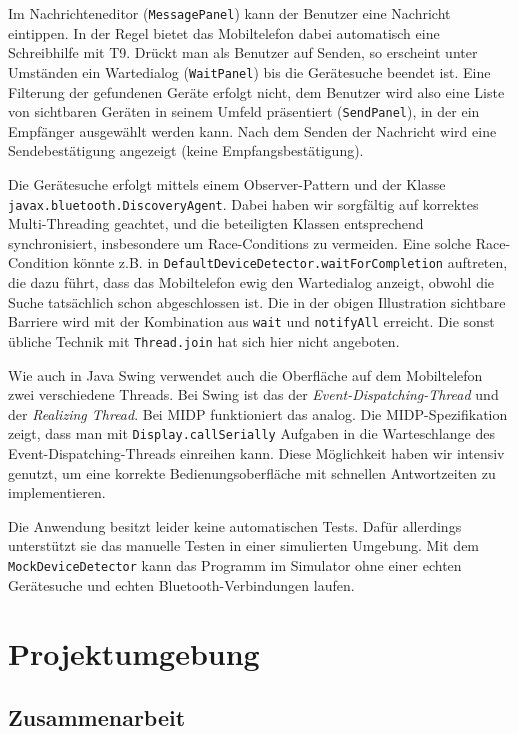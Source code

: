 \documentclass[ngerman]{article}
\begin{document}
Im Nachrichteneditor ({\tt MessagePanel}) kann der Benutzer eine Nachricht eintippen.
In der Regel bietet das Mobiltelefon dabei automatisch eine Schreibhilfe mit T9. Drückt
man als Benutzer auf Senden, so erscheint unter Umständen ein Wartedialog ({\tt WaitPanel}) 
bis die  Gerätesuche beendet ist. Eine Filterung der gefundenen Geräte erfolgt nicht, dem Benutzer
wird also eine Liste von sichtbaren Geräten in seinem Umfeld präsentiert ({\tt SendPanel}),
in der ein Empfänger ausgewählt werden kann. Nach dem Senden der Nachricht wird eine
Sen\-de\-be\-stä\-ti\-gung angezeigt (keine Empfangsbestätigung).

Die Gerätesuche erfolgt mittels einem Observer-Pattern und der Klasse \\{\tt javax.bluetooth.DiscoveryAgent}.
Dabei haben wir sorgfältig auf korrektes Multi-Threading geachtet, und die beteiligten Klassen entsprechend 
synchronisiert, insbesondere um Race-Conditions zu vermeiden. Eine solche Race-Condi\-tion könnte z.B. in
{\tt DefaultDeviceDetector.waitForCompletion} auftreten, die dazu führt, dass das Mobiltelefon ewig den
Wartedialog anzeigt, obwohl die Suche tatsächlich schon abgeschlossen ist. Die in der obigen Illustration
sichtbare Barriere wird mit der Kombination aus {\tt wait} und {\tt notifyAll} erreicht. Die sonst übliche
Technik mit {\tt Thread.join} hat sich hier nicht angeboten.

Wie auch in Java Swing verwendet auch die Oberfläche auf dem Mobiltelefon zwei verschiedene
Threads. Bei Swing ist das der \textit{Event-Dispatching-Thread} und der \textit{Realizing Thread}.
Bei MIDP funktioniert das analog. Die MIDP-Spezifikation zeigt, dass man mit {\tt Display.callSerially}
Aufgaben in die Warteschlange des Event-Dispatching-Threads einreihen kann. Diese Möglichkeit
haben wir intensiv genutzt, um eine korrekte Bedienungsoberfläche mit schnellen Antwortzeiten
zu implementieren.

Die Anwendung besitzt leider keine automatischen Tests. Dafür allerdings
unterstützt sie das manuelle Testen in einer simulierten Umgebung. Mit
dem {\tt MockDeviceDetector} kann das Programm im Simulator ohne
einer echten Ge\-rä\-te\-suche und echten Bluetooth-Verbindungen laufen.

\section{Projektumgebung}

\subsection{Zusammenarbeit}
\end{document}
